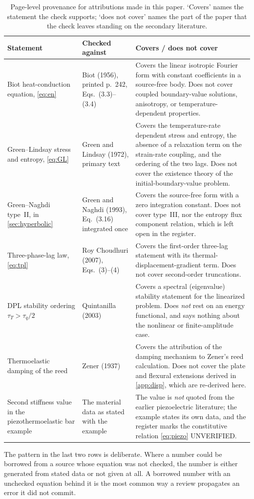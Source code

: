 \begin{table}[H]\centering\small
\caption{Page-level provenance for attributions made in this paper. `Covers' names the statement the check
supports; `does not cover' names the part of the paper that the check leaves standing on the secondary
literature.}
\label{tab:provenance}
\begin{tabularx}{\textwidth}{@{}p{3.1cm}Y Y@{}}
\toprule
\textbf{Statement} & \textbf{Checked against} & \textbf{Covers / does not cover} \\
\midrule
Biot heat-conduction equation, \eqref{eq:en} & Biot (1956), printed p.~242, Eqs.~(3.3)--(3.4) &
  Covers the linear isotropic Fourier form with constant coefficients in a source-free body. Does not
  cover coupled boundary-value solutions, anisotropy, or temperature-dependent properties. \\
Green--Lindsay stress and entropy, \eqref{eq:GL} & Green and Lindsay (1972), primary text &
  Covers the temperature-rate dependent stress and entropy, the absence of a relaxation term on the
  strain-rate coupling, and the ordering of the two lags. Does not cover the existence theory of the
  initial-boundary-value problem. \\
Green--Naghdi type~II, in \cref{sec:hyperbolic} & Green and Naghdi (1993), Eq.~(3.16) integrated once &
  Covers the source-free form with a zero integration constant. Does not cover type~III, nor the entropy
  flux component relation, which is left open in the register. \\
Three-phase-lag law, \eqref{eq:tpl} & Roy Choudhuri (2007), Eqs.~(3)--(4) &
  Covers the first-order three-lag statement with its thermal-displacement-gradient term. Does not cover
  second-order truncations. \\
DPL stability ordering $\tau_T>\tau_q/2$ & Quintanilla (2003) &
  Covers a spectral (eigenvalue) stability statement for the linearized problem. Does \emph{not} rest on
  an energy functional, and says nothing about the nonlinear or finite-amplitude case. \\
Thermoelastic damping of the reed & Zener (1937) &
  Covers the attribution of the damping mechanism to Zener's reed calculation. Does not cover the
  plate and flexural extensions derived in \cref{app:disp}, which are re-derived here. \\
Second stiffness value in the piezothermoelastic bar example & The material data as stated with the
  example & The value is \emph{not} quoted from the earlier piezoelectric literature; the example states
  its own data, and the register marks the constitutive relation \eqref{eq:piezo} UNVERIFIED. \\
\bottomrule
\end{tabularx}
\end{table}

The pattern in the last two rows is deliberate. Where a number could be borrowed from a source whose
equation was not checked, the number is either generated from stated data or not given at all. A borrowed
number with an unchecked equation behind it is the most common way a review propagates an error it did not
commit.
